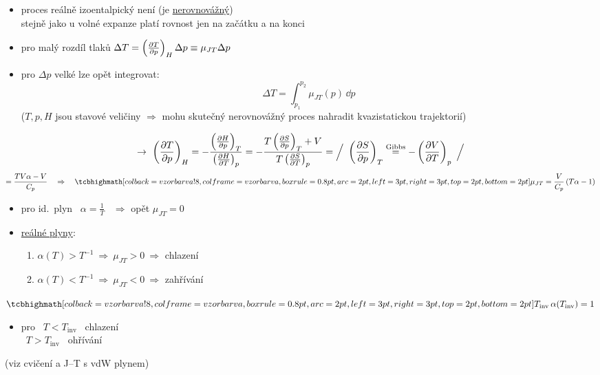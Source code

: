 \begin{itemize}
  \item proces reálně izoentalpický není (je \underline{nerovnovážný}) \\
        stejně jako u volné expanze platí rovnost jen na začátku a na konci
  \item pro malý rozdíl tlaků \quad $\Delta T = \left(\pdv{T}{p}\right)_H\Delta p \equiv \mu_{JT}\Delta p$
  \item pro $\Delta p$ velké lze opět integrovat:
  \[ \Delta T = \int_{p_1}^{p_2}\mu_{JT}(p)\,\dd p \]
  ($T, p, H$ jsou stavové veličiny $\Rightarrow$ mohu skutečný nerovnovážný proces nahradit  kvazistatickou trajektorií)
\end{itemize}
\[
  \to\ \left(\pdv{T}{p}\right)_H = -\frac{\left(\pdv{H}{p}\right)_T}{\left(\pdv{H}{T}\right)_p}
  = -\frac{T\left(\pdv{S}{p}\right)_T + V}{T\left(\pdv{S}{T}\right)_p}
  = \Big/\ \left(\pdv{S}{p}\right)_T \overset{\text{Gibbs}}{=} -\left(\pdv{V}{T}\right)_p\ \Big/
\]
\[
  = \frac{TV\alpha - V}{C_p} \quad\Rightarrow\quad \vzorec{\mu_{JT} = \frac{V}{C_p}\,(T\alpha - 1)}
\]
\begin{itemize}
  \item pro id.\ plyn \ $\alpha = \frac1T$ \ $\Rightarrow$ opět $\mu_{JT} = 0$
  \item \underline{reálné plyny}:
  \begin{enumerate}[label=\alph*)]
    \item $\alpha(T) > T^{-1} \ \Rightarrow\ \mu_{JT} > 0 \ \Rightarrow$ chlazení
    \item $\alpha(T) < T^{-1} \ \Rightarrow\ \mu_{JT} < 0 \ \Rightarrow$ zahřívání
  \end{enumerate}
\end{itemize}

\begin{definice}
 \quad $\vzorec{T_{\mathrm{inv}}\,\alpha(T_{\mathrm{inv}}) = 1}$
\begin{itemize}[nosep]
  \item[--] pro \ $T < T_{\mathrm{inv}}$ \ chlazení \\
            \phantom{pro} \ $T > T_{\mathrm{inv}}$ \ ohřívání
\end{itemize}
(viz cvičení a J--T s vdW plynem)
\end{definice}

